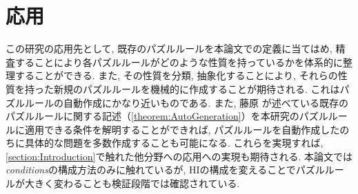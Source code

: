 \section{応用}
この研究の応用先として, 既存のパズルルールを本論文での定義に当てはめ, 精査することにより各パズルルールがどのような性質を持っているかを体系的に整理することができる. また, その性質を分類, 抽象化することにより, それらの性質を持った新規のパズルルールを機械的に作成することが期待される. これはパズルルールの自動作成にかなり近いものである. また, 藤原 \cite{Fujiwara2022}が述べている既存のパズルルールに関する記述（\cref{theorem:AutoGeneration}）を本研究のパズルルールに適用できる条件を解明することができれば, パズルルールを自動作成したのちに具体的な問題を多数作成することも可能になる. これらを実現すれば, \cref{section:Introduction}で触れた他分野への応用への実現も期待される.
本論文では\textit{conditions}の構成方法のみに触れているが, HIの構成を変えることでパズルルールが大きく変わることも検証段階では確認されている.
